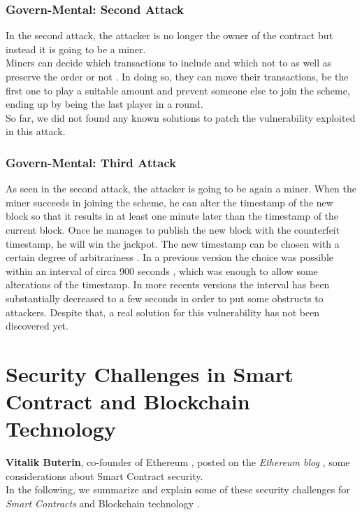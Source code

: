 \subsubsection{Govern-Mental: Second Attack}
In the second attack, the attacker is no longer the owner of the contract but instead it is going to be a miner.\\
Miners can decide which transactions to include and which not to as well as preserve the order or not \cite{paper2}. In doing so, they can move their transactions, be the first one to play a suitable amount and prevent someone else to join the scheme, ending up by being the last player in a round.\\
So far, we did not found any known solutions to patch the vulnerability exploited in this attack.


\subsubsection{Govern-Mental: Third Attack}
As seen in the second attack, the attacker is going to be again a miner. When the miner succeeds in joining the scheme, he can alter the timestamp of the new block so that it results in at least one minute later than the timestamp of the current block. Once he manages to publish the new block with the counterfeit timestamp, he will win the jackpot.
The new timestamp can be chosen with a certain degree of arbitrariness \cite{paper2}. In a previous version the choice was possible within an interval of circa 900 seconds \cite{BlockProtocol}, which was enough to allow some alterations of the timestamp. In more recents versions the interval has been substantially decreased to a few seconds \cite{paper2} in order to put some obstructs to attackers. Despite that, a real solution for this vulnerability has not been discovered yet.
\section{Security Challenges in Smart Contract and Blockchain Technology}
\textbf{Vitalik Buterin}, co-founder of Ethereum \cite{vitalin}, posted on the \textit{Ethereum blog} \cite{challenge2}, some considerations about Smart Contract security.\\
In the following, we summarize and explain some of these security challenges for  \textit{Smart Contracts} and Blockchain technology \cite{challenge1}.
